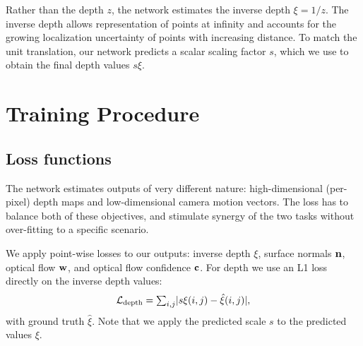 \documentclass[10pt,twocolumn,letterpaper]{article}
\begin{document}

Rather than the depth $z$, the network estimates the inverse depth $\xi = 1/z$.
The inverse depth allows representation of points at infinity and accounts for the growing localization uncertainty of points with increasing distance.%
To match the unit translation, our network predicts a scalar scaling factor $s$, which we use to obtain the final depth values $s\xi$.



\section{Training Procedure}
\label{sec:training}

\subsection{Loss functions}

The network estimates outputs of very different nature: high-dimensional (per-pixel) depth maps and low-dimensional camera motion vectors. 
The loss has to balance both of these objectives, and stimulate synergy of the two tasks without over-fitting to a specific scenario. 

We apply point-wise losses to our outputs: inverse depth $\xi$, surface normals $\mathbf{n}$, optical flow $\mathbf{w}$, and optical flow confidence $\mathbf{c}$.
For depth we use an L1 loss directly on the inverse depth values:
\begin{equation}
\label{eq:loss_depth}
\mathcal{L}_\text{depth} = \textstyle{\sum_{i,j}} \vert s\xi(i,j) - \hat{\xi}(i,j) \vert, 
\end{equation}
with ground truth $\hat\xi$.
Note that we apply the predicted scale $s$ to the predicted values $\xi$.
\end{document}
